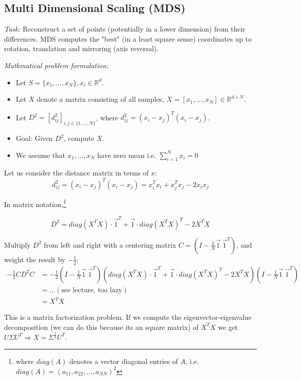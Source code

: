 
\subsection*{Multi Dimensional Scaling (MDS)}

\textit{Task:} Reconstruct a set of points (potentially in a lower dimension) from their differences. MDS computes the "best" (in a least square sense) coordinates up to rotation, translation and mirroring (axis reversal).

\textit{Mathmatical problem formulation:}
\begin{itemize}
    \item
        Let \(S = \{x_1, \dots, x_N\}, x_i \in \mathbb{R}^d\).
    \item
        Let \(X\) denote a matrix consisting of all samples, \(X=[x_1, \dots, x_N] \in \mathbb{R}^{d \times N}\).
    \item
        Let \(D^2 = [d_{ij}^2]_{i, j \in \{1, \dots, N\}}\), where \(d_{ij}^2 = (x_i - x_j)^T (x_i - x_j)\).
    \item
        Goal: Given \(D^2\), compute \(X\).
    \item
        We assume that \(x_1, \dots, x_N\) have zero mean i.e. \(\sum_{i=1}^N x_i = 0\)
\end{itemize}

Let us consider the distance matrix in terms of \(x\):
\[d_{ij}^2 = (x_i - x_j)^T(x_i - x_j)=x_i^T x_i + x_j^T x_j - 2 x_i x_j\]

In matrix notation,\footnote{where \(diag(A)\) denotes a vector diagonal entries of \(A\), i.e. \(diag(A) = (a_{11}, a_{22}, \dots, a_{NN})^2\)}

\[D^2 = diag(X^T X) \cdot \vec{1}^T + \vec{1} \cdot diag(X^T X)^T - 2X^TX\]


Multiply \(D^2\) from left and right with a centering matrix \(C = (I - \frac{1}{N} \vec{1} \ \vec{1}^T)\), and weight the result by \(-\frac{1}{2}\):
\begin{align*}
    -\frac{1}{2} C D^2 C &= -\frac{1}{2} (I- \frac{1}{N} \vec{1} \ \vec{1}^T) (diag(X^T X) \cdot \vec{1}^T + \vec{1} \cdot diag(X^T X)^T - 2X^TX)(I- \frac{1}{N} \vec{1} \ \vec{1}^T)\\
    &= \dots (\text{see lecture, too lazy}) \\
    &= X^T X
\end{align*}

This is a matrix factorization problem. If we compute the eigenvector-eigenvalue decomposition (we can do this because its an square matrix) of \(X^T X\) we get \(U \Sigma U^T \Rightarrow X = \Sigma^{\frac{1}{2}} U^T\).

